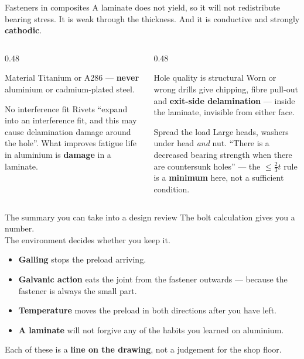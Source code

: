 \documentclass[aspectratio=169,10pt]{beamer}
\begin{document}
\begin{frame}{Fasteners in composites}
A laminate does not yield, so it will not redistribute bearing stress. It is weak through the
thickness. And it is conductive and strongly \textbf{cathodic}.
\vfill
\begin{columns}[T]
\begin{column}{0.48\textwidth}
\begin{alertblock}{Material}
Titanium or A286 --- \textbf{never} aluminium or cadmium-plated steel.
\end{alertblock}
\begin{alertblock}{No interference fit}
Rivets ``expand into an interference fit, and this may cause delamination damage around the hole''.
What improves fatigue life in aluminium is \textbf{damage} in a laminate.
\end{alertblock}
\end{column}
\begin{column}{0.48\textwidth}
\begin{alertblock}{Hole quality is structural}
Worn or wrong drills give chipping, fibre pull-out and \textbf{exit-side delamination} --- inside
the laminate, invisible from either face.
\end{alertblock}
\begin{alertblock}{Spread the load}
Large heads, washers under head \emph{and} nut. ``There is a decreased bearing strength when there
are countersunk holes'' --- the $\le\tfrac23 t$ rule is a \textbf{minimum} here, not a sufficient
condition.
\end{alertblock}
\end{column}
\end{columns}
\end{frame}

\begin{frame}{The summary you can take into a design review}
\centering
\large
The bolt calculation gives you a number.\\[4pt]
\alert{The environment decides whether you keep it.}
\vfill
\raggedright\normalsize
\begin{itemize}
\item \textbf{Galling} stops the preload arriving.
\item \textbf{Galvanic action} eats the joint from the fastener outwards --- because the fastener is
  always the small part.
\item \textbf{Temperature} moves the preload in both directions after you have left.
\item \textbf{A laminate} will not forgive any of the habits you learned on aluminium.
\end{itemize}
\vfill
\centering
Each of these is a \textbf{line on the drawing}, not a judgement for the shop floor.
\end{frame}
\end{document}

